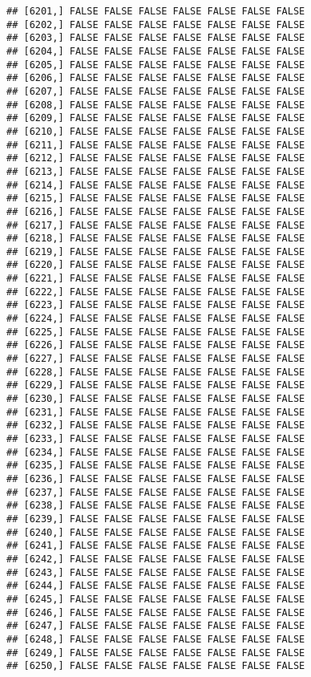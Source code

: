 \documentclass[
]{article}
\begin{document}
\begin{verbatim}
## [6201,] FALSE FALSE FALSE FALSE FALSE FALSE FALSE
## [6202,] FALSE FALSE FALSE FALSE FALSE FALSE FALSE
## [6203,] FALSE FALSE FALSE FALSE FALSE FALSE FALSE
## [6204,] FALSE FALSE FALSE FALSE FALSE FALSE FALSE
## [6205,] FALSE FALSE FALSE FALSE FALSE FALSE FALSE
## [6206,] FALSE FALSE FALSE FALSE FALSE FALSE FALSE
## [6207,] FALSE FALSE FALSE FALSE FALSE FALSE FALSE
## [6208,] FALSE FALSE FALSE FALSE FALSE FALSE FALSE
## [6209,] FALSE FALSE FALSE FALSE FALSE FALSE FALSE
## [6210,] FALSE FALSE FALSE FALSE FALSE FALSE FALSE
## [6211,] FALSE FALSE FALSE FALSE FALSE FALSE FALSE
## [6212,] FALSE FALSE FALSE FALSE FALSE FALSE FALSE
## [6213,] FALSE FALSE FALSE FALSE FALSE FALSE FALSE
## [6214,] FALSE FALSE FALSE FALSE FALSE FALSE FALSE
## [6215,] FALSE FALSE FALSE FALSE FALSE FALSE FALSE
## [6216,] FALSE FALSE FALSE FALSE FALSE FALSE FALSE
## [6217,] FALSE FALSE FALSE FALSE FALSE FALSE FALSE
## [6218,] FALSE FALSE FALSE FALSE FALSE FALSE FALSE
## [6219,] FALSE FALSE FALSE FALSE FALSE FALSE FALSE
## [6220,] FALSE FALSE FALSE FALSE FALSE FALSE FALSE
## [6221,] FALSE FALSE FALSE FALSE FALSE FALSE FALSE
## [6222,] FALSE FALSE FALSE FALSE FALSE FALSE FALSE
## [6223,] FALSE FALSE FALSE FALSE FALSE FALSE FALSE
## [6224,] FALSE FALSE FALSE FALSE FALSE FALSE FALSE
## [6225,] FALSE FALSE FALSE FALSE FALSE FALSE FALSE
## [6226,] FALSE FALSE FALSE FALSE FALSE FALSE FALSE
## [6227,] FALSE FALSE FALSE FALSE FALSE FALSE FALSE
## [6228,] FALSE FALSE FALSE FALSE FALSE FALSE FALSE
## [6229,] FALSE FALSE FALSE FALSE FALSE FALSE FALSE
## [6230,] FALSE FALSE FALSE FALSE FALSE FALSE FALSE
## [6231,] FALSE FALSE FALSE FALSE FALSE FALSE FALSE
## [6232,] FALSE FALSE FALSE FALSE FALSE FALSE FALSE
## [6233,] FALSE FALSE FALSE FALSE FALSE FALSE FALSE
## [6234,] FALSE FALSE FALSE FALSE FALSE FALSE FALSE
## [6235,] FALSE FALSE FALSE FALSE FALSE FALSE FALSE
## [6236,] FALSE FALSE FALSE FALSE FALSE FALSE FALSE
## [6237,] FALSE FALSE FALSE FALSE FALSE FALSE FALSE
## [6238,] FALSE FALSE FALSE FALSE FALSE FALSE FALSE
## [6239,] FALSE FALSE FALSE FALSE FALSE FALSE FALSE
## [6240,] FALSE FALSE FALSE FALSE FALSE FALSE FALSE
## [6241,] FALSE FALSE FALSE FALSE FALSE FALSE FALSE
## [6242,] FALSE FALSE FALSE FALSE FALSE FALSE FALSE
## [6243,] FALSE FALSE FALSE FALSE FALSE FALSE FALSE
## [6244,] FALSE FALSE FALSE FALSE FALSE FALSE FALSE
## [6245,] FALSE FALSE FALSE FALSE FALSE FALSE FALSE
## [6246,] FALSE FALSE FALSE FALSE FALSE FALSE FALSE
## [6247,] FALSE FALSE FALSE FALSE FALSE FALSE FALSE
## [6248,] FALSE FALSE FALSE FALSE FALSE FALSE FALSE
## [6249,] FALSE FALSE FALSE FALSE FALSE FALSE FALSE
## [6250,] FALSE FALSE FALSE FALSE FALSE FALSE FALSE

\end{verbatim}
\end{document}
